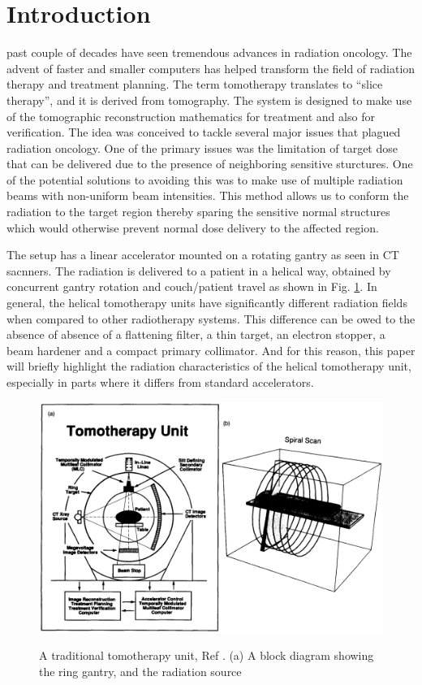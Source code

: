 \documentclass[12pt,journal,compsoc]{IEEEtran} %
\begin{document}
  \section{Introduction}
	 past couple of decades have seen tremendous advances in radiation oncology. The advent of faster and smaller computers has helped transform the field of radiation therapy and treatment planning. The term tomotherapy translates to ``slice therapy'', and it is derived from tomography. The system is designed to make use of the tomographic reconstruction mathematics for treatment and also for verification. The idea was conceived to tackle several major issues that plagued radiation oncology. One of the primary issues was the limitation of target dose that can be delivered due to the presence of neighboring sensitive sturctures. One of the potential solutions to avoiding this was to make use of multiple radiation beams with non-uniform beam intensities. This method allows us to conform the radiation to the target region thereby sparing the sensitive normal structures which would otherwise prevent normal dose delivery to the affected region.
  
  The setup has a linear accelerator mounted on a rotating gantry as seen in CT sacnners. The radiation is delivered to a patient in a helical way, obtained by concurrent gantry rotation and couch/patient travel as shown in Fig. \ref{fig1}. In general, the helical tomotherapy units have significantly different radiation fields when compared to other radiotherapy systems. This difference can be owed to the absence of absence of a flattening filter, a thin target, an electron stopper, a beam hardener and a compact primary collimator. And for this reason, this paper will briefly highlight the radiation characteristics of the helical tomotherapy unit, especially in parts where it differs from standard accelerators.
  \begin{figure}[t!]
	\includegraphics[width=\linewidth]{fig1}
  \label{fig1}
  \caption{A traditional tomotherapy unit, Ref \cite{Mackie1993}. (a) A block diagram showing the ring gantry, and the radiation source}
  \end{figure}
  
  {}
  
  
\end{document}
